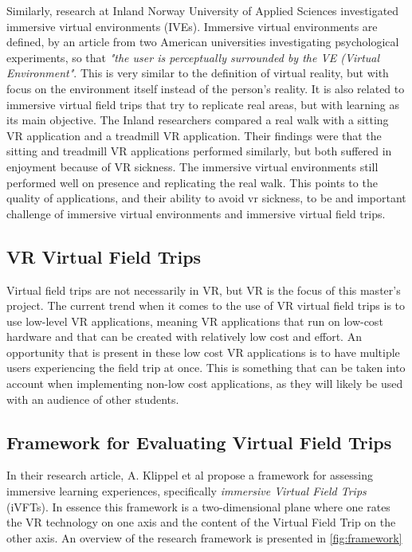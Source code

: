         
        Similarly, research at Inland Norway University of Applied Sciences\cite{innland_university} investigated immersive virtual environments (IVEs). Immersive virtual environments are defined, by an article from two American universities investigating psychological experiments\cite{ive_definition}, so that \textit{"the user is perceptually surrounded by the VE (Virtual Environment"}. This is very similar to the definition of virtual reality, but with focus on the environment itself instead of the person's reality. It is also related to immersive virtual field trips that try to replicate real areas, but with learning as its main objective. The Inland researchers compared a real walk with a sitting VR application and a treadmill VR application. Their findings were that the sitting and treadmill VR applications performed similarly, but both suffered in enjoyment because of VR sickness. The immersive virtual environments still performed well on presence and replicating the real walk. This points to the quality of applications, and their ability to avoid vr sickness, to be and important challenge of immersive virtual environments and immersive virtual field trips.
        \cite{ive}
    
    \subsection{VR Virtual Field Trips}
        Virtual field trips are not necessarily in VR, but VR is the focus of this master's project. The current trend when it comes to the use of VR virtual field trips is to use low-level VR applications, meaning VR applications that run on low-cost hardware and that can be created with relatively low cost and effort\cite{vr_low_cost}. An opportunity that is present in these low cost VR applications is to have multiple users experiencing the field trip at once. This is something that can be taken into account when implementing non-low cost applications, as they will likely be used with an audience of other students.
    
    \subsection{Framework for Evaluating Virtual Field Trips}
        \label{sec:framework}
        In their research article, A. Klippel et al \cite{research_framework} propose a framework for assessing immersive learning experiences, specifically \emph{immersive Virtual Field Trips} (iVFTs). In essence this framework is a two-dimensional plane where one rates the VR technology on one axis and the content of the Virtual Field Trip on the other axis. An overview of the research framework is presented in \cref{fig:framework}
        
